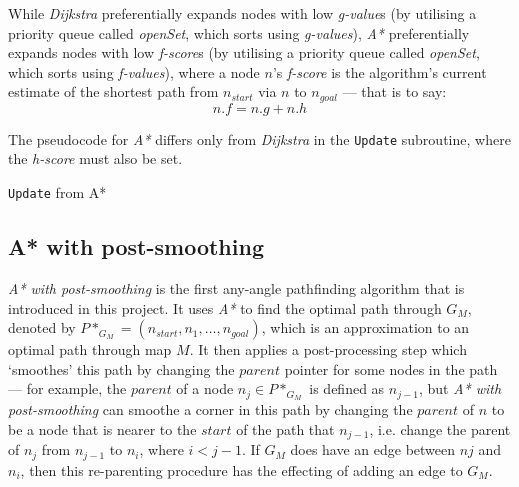 \documentclass[12pt,notitlepage]{report}
\begin{document}
\noindent
While {\em Dijkstra} preferentially expands nodes with low {\em g-value}s (by utilising a priority queue called {\em openSet}, which sorts using {\em g-values}), {\em A*} preferentially expands nodes with low {\em f-score}s (by utilising a priority queue called {\em openSet}, which sorts using {\em f-values}), where a node $n$'s {\em f-score} is the algorithm's current estimate of the shortest path from $n_{start}$ via $n$ to $n_{goal}$ --- that is to say:
\begin{equation}
n.f = n.g + n.h
\end{equation}

\noindent
The pseudocode for {\em A*} differs only from {\em Dijkstra} in the {\tt Update} subroutine, where the {\em h-score} must also be set.

\begin{algorithm}
  \SetAlgoLined\DontPrintSemicolon
  \caption{{\tt Update} from {\sc A*}}
\end{algorithm} 

\subsection {A* with post-smoothing}

{\em A* with post-smoothing} is the first any-angle pathfinding algorithm that is introduced in this project. It uses {\em A*} to find the optimal path through $G_{M}$, denoted by $P*_{G_{M}} = (n_{start}, n_{1}, \ldots, n_{goal})$, which is an approximation to an optimal path through map $M$. It then applies a post-processing step which `smoothes' this path by changing the $parent$ pointer for some nodes in the path --- for example, the $parent$ of a node $n_{j} \in P*_{G_{M}}$ is defined as $n_{j-1}$, but {\em A* with post-smoothing} can smoothe a corner in this path by changing the $parent$ of  $n$ to be a node that is nearer to the $start$ of the path that $n_{j-1}$, i.e. change the parent of $n_{j}$ from $n_{j-1}$ to $n_{i}$, where $i<j-1$. If $G_{M}$ does have an edge between $n{j}$ and $n_{i}$, then this re-parenting procedure has the effecting of adding an edge to $G_{M}$.\\
\end{document}

